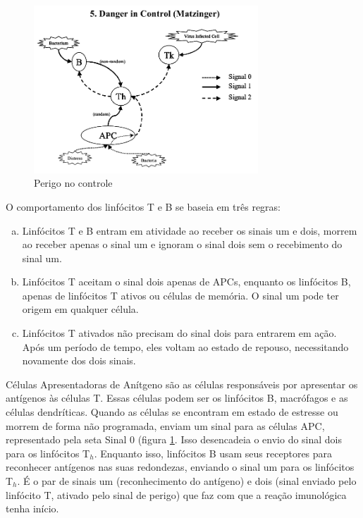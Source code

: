 \begin{figure}[h!]
    \vspace{1cm}
    \centering
    \includegraphics[width=0.75\textwidth]{img/signals5-danger.png}
    \caption{Perigo no controle \cite{Aickelin2002}}
    \label{img:nis_danger}
    \vspace{1cm}
\end{figure}

O comportamento dos linfócitos T e B se baseia em três regras:

\begin{enumerate}[a)]
\item Linfócitos T e B entram em atividade ao receber os sinais um e dois, morrem ao receber apenas o sinal um e ignoram o sinal dois sem o recebimento do sinal um.
\item Linfócitos T aceitam o sinal dois apenas de APCs, enquanto os linfócitos B, apenas de linfócitos T ativos ou células de memória. O sinal um pode ter origem em qualquer célula.
\item Linfócitos T ativados não precisam do sinal dois para entrarem em ação. Após um período de tempo, eles voltam ao estado de repouso, necessitando novamente dos dois sinais.
\end{enumerate}

Células Apresentadoras de Anítgeno são as células responsáveis por apresentar os antígenos às células T. Essas células podem ser os linfócitos B, macrófagos e as células dendríticas. Quando as células se encontram em estado de estresse ou morrem de forma não programada, enviam um sinal para as células APC, representado pela seta Sinal 0 (figura \ref{img:nis_danger}. Isso desencadeia o envio do sinal dois para os linfócitos T$_{h}$. Enquanto isso, linfócitos B usam seus receptores para reconhecer antígenos nas suas redondezas, enviando o sinal um para os linfócitos T$_{h}$. É o par de sinais um (reconhecimento do antígeno) e dois (sinal enviado pelo linfócito T, ativado pelo sinal de perigo) que faz com que a reação imunológica tenha início.

